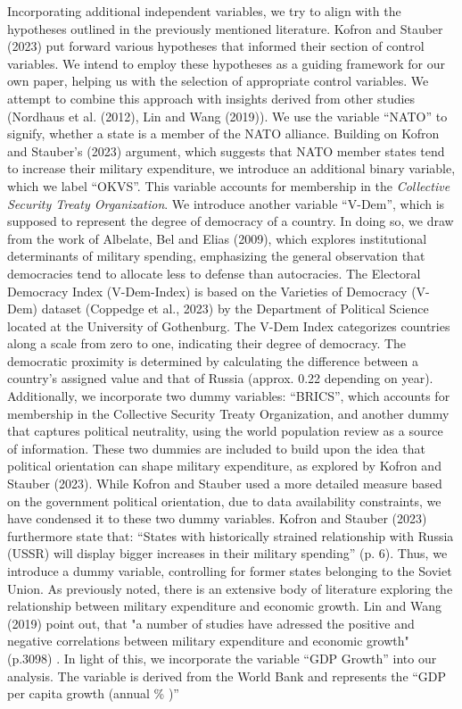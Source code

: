 \documentclass[12pt,a4paper]{article}
\begin{document}
Incorporating additional independent variables, we try to align with the hypotheses outlined in the previously mentioned literature. Kofron and Stauber (2023) put forward various hypotheses that informed their section of control variables. We intend to employ these hypotheses as a guiding framework for our own paper, helping us with the selection of appropriate control variables. We attempt to combine this approach with insights derived from other studies (Nordhaus et al. (2012), Lin and Wang (2019)). We use the variable “NATO” to signify, whether a state is a member of the NATO alliance. Building on Kofron and Stauber’s (2023) argument, which suggests that NATO member states tend to increase their military expenditure, we introduce an additional binary variable, which we label “OKVS”. This variable accounts for membership in the \textit{Collective Security Treaty Organization}. 
We introduce another variable “V-Dem”, which is supposed to represent the degree of democracy of a country. In doing so, we draw from the work of Albelate, Bel and Elias (2009), which explores institutional determinants of military spending, emphasizing the general observation that democracies tend to allocate less to defense than autocracies. The Electoral Democracy Index (V-Dem-Index) is based on the Varieties of Democracy (V-Dem) dataset (Coppedge et al., 2023) by the Department of Political Science located at the University of Gothenburg. The V-Dem Index categorizes countries along a scale from zero to one, indicating their degree of democracy. The democratic proximity is determined by calculating the difference between a country’s assigned value and that of Russia (approx. 0.22 depending on year). \\

Additionally, we incorporate two dummy variables: “BRICS”, which accounts for membership in the Collective Security Treaty Organization, and another dummy that captures political neutrality, using the world population review as a source of information. These two dummies are included to build upon the idea that political orientation can shape military expenditure, as explored by Kofron and Stauber (2023). While Kofron and Stauber used a more detailed measure based on the government political orientation, due to data availability constraints, we have condensed it to these two dummy variables. Kofron and Stauber (2023) furthermore state that: “States with historically strained relationship with Russia (USSR) will display bigger increases in their military spending” (p. 6). Thus, we introduce a dummy variable, controlling for former states belonging to the Soviet Union. As previously noted, there is an extensive body of literature exploring the relationship between military expenditure and economic growth. Lin and Wang (2019) point out, that "a number of studies have adressed the positive and negative correlations between military expenditure and economic growth" (p.3098) . In light of this, we incorporate the variable “GDP Growth” into our analysis. The variable is derived from the World Bank and represents the “GDP per capita growth (annual \% )”\\
\end{document}
